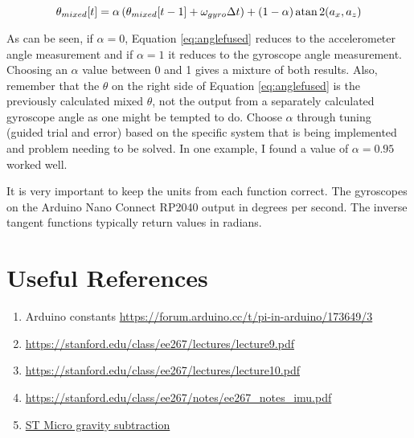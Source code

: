 \begin{equation}
	\label{eq:anglefused}
	\theta_{mixed}[t] = \alpha \left(\theta_{mixed}[t-1] + \omega_{gyro}\Delta t \right) + (1-\alpha)\atan2(a_x,a_z)
\end{equation}

As can be seen, if $\alpha=0$, Equation \ref{eq:anglefused} reduces to the accelerometer angle measurement 
and if $\alpha=1$ it reduces to the gyroscope angle measurement. Choosing an $\alpha$ value between 0 and 1 gives a 
mixture of both results. Also, remember that the $\theta$ on the right side of Equation \ref{eq:anglefused} 
is the previously calculated mixed $\theta$, not the output from a separately calculated gyroscope angle as 
one might be tempted to do. Choose $\alpha$ through tuning (guided trial and error) based on the specific 
system that is being implemented and problem needing to be solved. In one example, I found a value of $\alpha=0.95$ 
worked well.

It is very important to keep the units from each function correct. The gyroscopes on the Arduino Nano Connect RP2040
output in degrees per second. The inverse tangent functions typically return values in radians.


\section{Useful References}
\begin{enumerate}
	\item Arduino constants \href{https://forum.arduino.cc/t/pi-in-arduino/173649/3}{https://forum.arduino.cc/t/pi-in-arduino/173649/3}
	\item \href{https://stanford.edu/class/ee267/lectures/lecture9.pdf}{https://stanford.edu/class/ee267/lectures/lecture9.pdf}
	\item \href{https://stanford.edu/class/ee267/lectures/lecture10.pdf}{https://stanford.edu/class/ee267/lectures/lecture10.pdf}
	\item \href{https://stanford.edu/class/ee267/notes/ee267\_notes\_imu.pdf}{https://stanford.edu/class/ee267/notes/ee267\_notes\_imu.pdf}
	\item \href{https://www.st.com/resource/en/design\_tip/dt0106-residual-linear-acceleration-by-gravity-subtraction-to-enable-deadreckoning-stmicroelectronics.pdf}{ST Micro gravity subtraction}
\end{enumerate}
